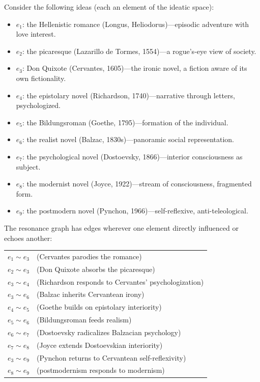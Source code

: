 \documentclass[11pt,openany]{book}
\theoremstyle{definition}
\theoremstyle{plain}
\theoremstyle{remark}
\newcommand{\res}{\sim}                      %
\begin{document}
Consider the following ideas (each an element of the ideatic space):
\begin{itemize}
\item $e_1$: the Hellenistic romance (Longus, Heliodorus)---episodic adventure with love interest.
\item $e_2$: the picaresque (Lazarillo de Tormes, 1554)---a rogue's-eye view of society.
\item $e_3$: Don Quixote (Cervantes, 1605)---the ironic novel, a fiction aware of its own fictionality.
\item $e_4$: the epistolary novel (Richardson, 1740)---narrative through letters, psychologized.
\item $e_5$: the Bildungsroman (Goethe, 1795)---formation of the individual.
\item $e_6$: the realist novel (Balzac, 1830s)---panoramic social representation.
\item $e_7$: the psychological novel (Dostoevsky, 1866)---interior consciousness as subject.
\item $e_8$: the modernist novel (Joyce, 1922)---stream of consciousness, fragmented form.
\item $e_9$: the postmodern novel (Pynchon, 1966)---self-reflexive, anti-teleological.
\end{itemize}

The resonance graph has edges wherever one element directly influenced or echoes another:

\begin{center}
\begin{tabular}{ll}
$e_1 \res e_3$ & (Cervantes parodies the romance) \\
$e_2 \res e_3$ & (Don Quixote absorbs the picaresque) \\
$e_3 \res e_4$ & (Richardson responds to Cervantes' psychologization) \\
$e_3 \res e_6$ & (Balzac inherits Cervantean irony) \\
$e_4 \res e_5$ & (Goethe builds on epistolary interiority) \\
$e_5 \res e_6$ & (Bildungsroman feeds realism) \\
$e_6 \res e_7$ & (Dostoevsky radicalizes Balzacian psychology) \\
$e_7 \res e_8$ & (Joyce extends Dostoevskian interiority) \\
$e_3 \res e_9$ & (Pynchon returns to Cervantean self-reflexivity) \\
$e_8 \res e_9$ & (postmodernism responds to modernism) \\
\end{tabular}
\end{center}
\end{document}
